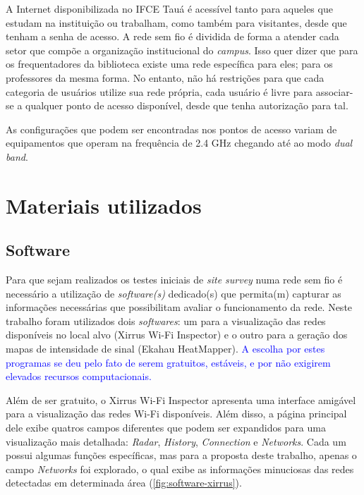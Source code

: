 A Internet disponibilizada no IFCE Tauá é acessível tanto para aqueles que estudam na instituição ou trabalham, como também para visitantes, desde que tenham a senha de acesso. A rede sem fio é dividida de forma a atender cada setor que compõe a organização institucional do \textit{campus}. Isso quer dizer que para os frequentadores da biblioteca existe uma rede específica para eles; para os professores da mesma forma. No entanto, não há restrições para que cada categoria de usuários utilize sua rede própria, cada usuário é livre para associar-se a qualquer ponto de acesso disponível, desde que tenha autorização para tal.

As configurações que podem ser encontradas nos pontos de acesso variam de equipamentos que operam na frequência de 2.4 GHz chegando até ao modo \textit{dual band}.


\section{Materiais utilizados}
\label{materiais-uyilizados}

\subsection{Software}
\label{subsec:softwares-utiliados}

Para que sejam realizados os testes iniciais de \textit{site survey} numa rede sem fio é necessário a utilização de \textit{software(s)} dedicado(s) que permita(m) capturar as informações necessárias que possibilitam avaliar o funcionamento da rede. Neste trabalho foram utilizados dois \textit{softwares}: um para a visualização das redes disponíveis no local alvo (Xirrus Wi-Fi Inspector) e o outro para a geração dos mapas de intensidade de sinal (Ekahau HeatMapper). \textcolor{blue}{A escolha por estes programas se deu pelo fato de serem gratuitos, estáveis, e por não exigirem elevados recursos computacionais.}

Além de ser gratuito, o Xirrus Wi-Fi Inspector apresenta uma interface amigável para a visualização das redes Wi-Fi disponíveis. Além disso, a página principal dele exibe quatros campos diferentes que podem ser expandidos para uma visualização mais detalhada: \textit{Radar}, \textit{History}, \textit{Connection} e \textit{Networks}. Cada um possui algumas funções específicas, mas para a proposta deste trabalho, apenas o campo \textit{Networks} foi explorado, o qual exibe as informações minuciosas das redes detectadas em determinada área (\autoref{fig:software-xirrus}).

